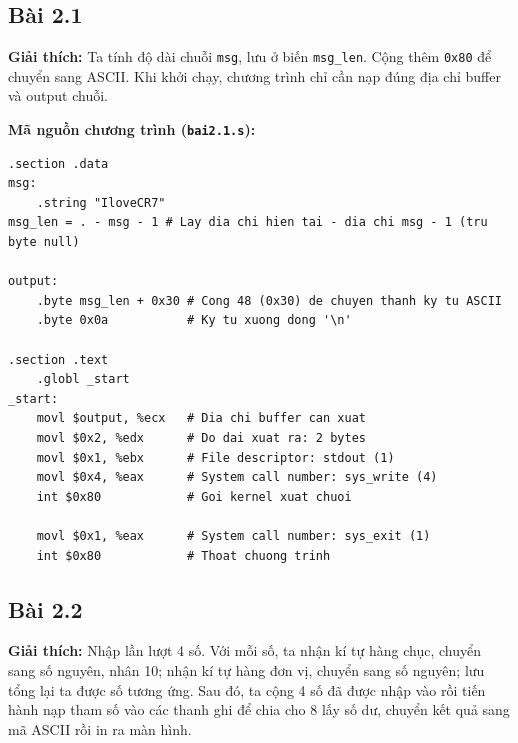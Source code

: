 \documentclass[12pt,a4paper]{article}
\begin{document}
\subsection{Bài 2.1}

\textbf{Giải thích:}
Ta tính độ dài chuỗi \texttt{msg}, lưu ở biến \texttt{msg\_len}. Cộng thêm \texttt{0x80} để chuyển sang ASCII. Khi khởi chạy, chương trình chỉ cần nạp đúng địa chỉ buffer và output chuỗi.

\textbf{Mã nguồn chương trình (\texttt{bai2.1.s}):}
\begin{lstlisting}
.section .data
msg:
	.string "IloveCR7"
msg_len = . - msg - 1 # Lay dia chi hien tai - dia chi msg - 1 (tru byte null)

output:
	.byte msg_len + 0x30 # Cong 48 (0x30) de chuyen thanh ky tu ASCII
	.byte 0x0a           # Ky tu xuong dong '\n'

.section .text
	.globl _start
_start:
	movl $output, %ecx   # Dia chi buffer can xuat
	movl $0x2, %edx      # Do dai xuat ra: 2 bytes
	movl $0x1, %ebx      # File descriptor: stdout (1)
	movl $0x4, %eax      # System call number: sys_write (4)
	int $0x80            # Goi kernel xuat chuoi

	movl $0x1, %eax      # System call number: sys_exit (1)
	int $0x80            # Thoat chuong trinh
\end{lstlisting}

\subsection{Bài 2.2}

\textbf{Giải thích:}
Nhập lần lượt 4 số. Với mỗi số, ta nhận kí tự hàng chục, chuyển sang số nguyên, nhân 10; nhận kí tự hàng đơn vị, chuyển sang số nguyên; lưu tổng lại ta được số tương ứng. Sau đó, ta cộng 4 số đã được nhập vào rồi tiến hành nạp tham số vào các thanh ghi để chia cho 8 lấy số dư, chuyển kết quả sang mã ASCII rồi in ra màn hình.
\end{document}

